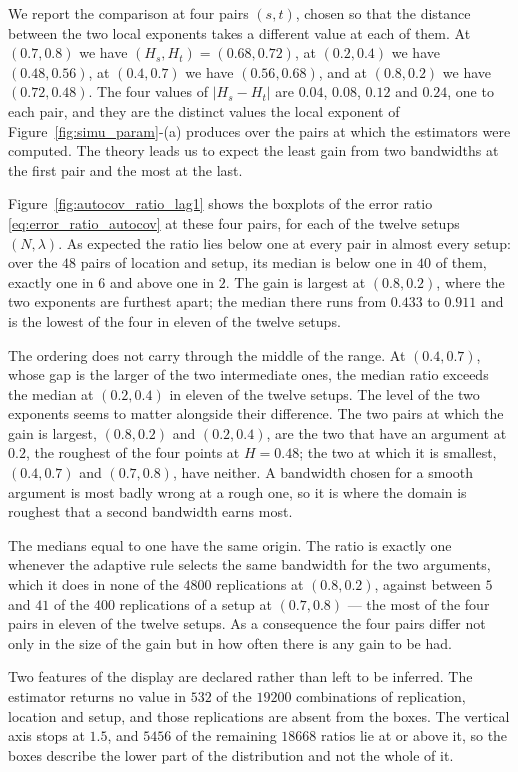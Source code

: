 \color{magenta}
We report the comparison at four pairs $(s,t)$, chosen so that the distance between the two local exponents takes a different value at each of them. At $(0.7, 0.8)$ we have $(H_s, H_t) = (0.68, 0.72)$, at $(0.2, 0.4)$ we have $(0.48, 0.56)$, at $(0.4, 0.7)$ we have $(0.56, 0.68)$, and at $(0.8, 0.2)$ we have $(0.72, 0.48)$. The four values of $|H_s - H_t|$ are $0.04$, $0.08$, $0.12$ and $0.24$, one to each pair, and they are the distinct values the local exponent of Figure~\ref{fig:simu_param}-(a) produces over the pairs at which the estimators were computed. The theory leads us to expect the least gain from two bandwidths at the first pair and the most at the last.

Figure~\ref{fig:autocov_ratio_lag1} shows the boxplots of the error ratio \eqref{eq:error_ratio_autocov} at these four pairs, for each of the twelve setups $(N, \lambda)$. As expected the ratio lies below one at every pair in almost every setup: over the $48$ pairs of location and setup, its median is below one in $40$ of them, exactly one in $6$ and above one in $2$. The gain is largest at $(0.8, 0.2)$, where the two exponents are furthest apart; the median there runs from $0.433$ to $0.911$ and is the lowest of the four in eleven of the twelve setups.

The ordering does not carry through the middle of the range. At $(0.4, 0.7)$, whose gap is the larger of the two intermediate ones, the median ratio exceeds the median at $(0.2, 0.4)$ in eleven of the twelve setups. The level of the two exponents seems to matter alongside their difference. The two pairs at which the gain is largest, $(0.8, 0.2)$ and $(0.2, 0.4)$, are the two that have an argument at $0.2$, the roughest of the four points at $H = 0.48$; the two at which it is smallest, $(0.4, 0.7)$ and $(0.7, 0.8)$, have neither. A bandwidth chosen for a smooth argument is most badly wrong at a rough one, so it is where the domain is roughest that a second bandwidth earns most.

The medians equal to one have the same origin. The ratio is exactly one whenever the adaptive rule selects the same bandwidth for the two arguments, which it does in none of the $4800$ replications at $(0.8, 0.2)$, against between $5$ and $41$ of the $400$ replications of a setup at $(0.7, 0.8)$ --- the most of the four pairs in eleven of the twelve setups. As a consequence the four pairs differ not only in the size of the gain but in how often there is any gain to be had.

Two features of the display are declared rather than left to be inferred. The estimator returns no value in $532$ of the $19200$ combinations of replication, location and setup, and those replications are absent from the boxes. The vertical axis stops at $1.5$, and $5456$ of the remaining $18668$ ratios lie at or above it, so the boxes describe the lower part of the distribution and not the whole of it.
\color{black}

